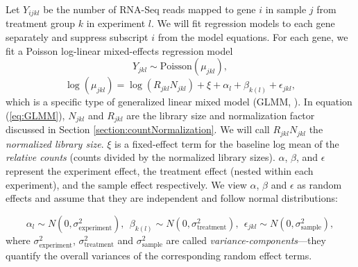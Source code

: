 \documentclass[letterpaper,12pt]{article}
\begin{document}
Let $Y_{ijkl}$ be the number of RNA-Seq reads mapped to gene
$i$ in sample $j$ from treatment group $k$  in experiment $l$. We will fit
regression models to each gene separately and suppress subscript $i$ from the
model equations.  For each gene, we fit a Poisson log-linear mixed-effects regression model 
\begin{equation}
  Y_{jkl} \sim \text{Poisson}(\mu_{jkl}),
\end{equation}
\begin{equation}\label{eq:GLMM}
	  \log( \mu_{jkl}) = \log(R_{jkl}N_{jkl})+ \xi + \alpha_l + \beta_{k(l)} + \epsilon_{jkl},
\end{equation}
which is a specific type of generalized linear mixed model (GLMM, \citet{mcculloch2001generalized}). 
In equation (\ref{eq:GLMM}), $N_{jkl}$ and $R_{jkl}$ are the library size and normalization factor discussed in
Section \ref{section:countNormalization}. We will call $R_{jkl}N_{jkl}$ 
the \textit{normalized library size}.
$\xi$ is a fixed-effect term for the baseline log mean of the {\em relative
counts} (counts divided by the normalized library sizes). 
$\alpha$, $\beta$, and $\epsilon$ %
represent the experiment effect, the treatment effect (nested within each
experiment), and the sample effect respectively. 
We view  $\alpha$, $\beta$ and $\epsilon$ as random effects and assume that
they are independent and follow normal distributions:

\begin{equation}\label{eq:normalassumption}
  \alpha_l\sim N(0, \sigma^2_{\text{experiment}}),~~
  \beta_{k(l)}\sim N(0, \sigma^2_{\text{treatment}}),~~
  \epsilon_{jkl}\sim N(0, \sigma_{\text{sample}}^2),
\end{equation}
where $\sigma_{\text{experiment}}^2$, $\sigma_{\text{treatment}}^2$ and
$\sigma_{\text{sample}}^2$ are called \textit{variance-components}---they
quantify the overall variances of the corresponding random effect terms. 
\end{document}
